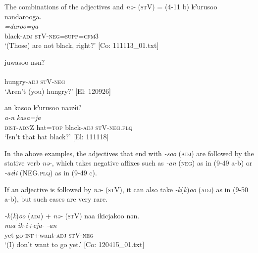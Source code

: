 \ea   The combinations of the adjectives and \textit{nə-} (\textsc{st}V) \label{ex:9.49}
  \ea{} = (4-11 b)
    \glll  kˀurusoo  nəndarooga.\\
      \textit{}  \textit{=daroo=ga}\\
      black-\textsc{adj}  \textsc{st}V-\textsc{neg}=\textsc{supp}=\textsc{cfm}3\\
      \glt       ‘(Those) are not black, right?’ [Co: 111113\_01.txt]

\ex\relax [= (4-50 d)]
    \glll  juwasoo  nən?\\
      \textit{}  \textit{}\\
      hungry-\textsc{adj}  \textsc{st}V-\textsc{neg}\\
      \glt       ‘Aren’t (you) hungry?’ [El: 120926]

\ex\relax [= (8-49 b)]
    \glll  an  kasoo  kˀurusoo  nəəzɨi?\\
      \textit{a-n}  \textit{kasa=ja}  \textit{}  \textit{}\\
      \textsc{dist}-\textsc{adn}Z  hat=\textsc{top}  black-\textsc{adj}  \textsc{st}V-\textsc{neg}.\textsc{plq}\\
      \glt       ‘Isn’t that hat black?’ [El: 111118]
    \z
\z

In the above examples, the adjectives that end with \textit{{}-soo} (\textsc{adj}) are followed by the stative verb \textit{nə-}, which takes negative affixes such as \textit{{}-an} (\textsc{neg}) as in (9-49 a-b) or \textit{{}-azɨi} (NEG.\textsc{plq}) as in (9-49 c).

If an adjective is followed by \textit{nə-} (\textsc{st}V), it can also take \textit{{}-k}(\textit{k})\textit{oo} (\textsc{adj}) as in (9-50 a-b), but such cases are very rare.

\ea   \textit{{}-k}(\textit{k})\textit{oo} (\textsc{adj}) + \textit{nə-} (\textsc{st}V) \label{ex:9.50}
\ea %
 \glll  naa  ikicjakoo  nən.\\
      \textit{naa}  \textit{ik-i+cja-}  \textit{-an}\\
      yet  go-\textsc{inf}+want-\textsc{adj}  \textsc{st}V-\textsc{neg}\\
      \glt       ‘(I) don’t want to go yet.’ [Co: 120415\_01.txt]

